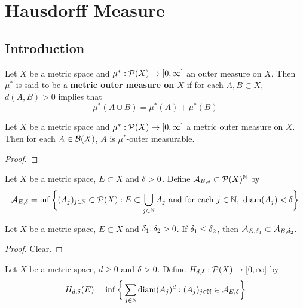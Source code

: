 \documentclass{book}
\begin{document}
	
	
	
	
	
	\newpage
	\chapter{Hausdorff Measure}
	
	\section{Introduction}
	
	\begin{defn}
	Let $X$ be a metric space and $\mu^*: \mathcal{P}(X) \rightarrow [0, \infty]$ an outer measure on $X$. Then $\mu^*$ is said to be a \textbf{metric outer measure on $X$} if for each $A, B \subset X$, $d(A,B) > 0$ implies that 
	\begin{equation*}
	\mu^*(A \cup B) = \mu^*(A) + \mu^*(B)
	\end{equation*}
	\end{defn}	
	
	\begin{ex}
	Let $X$ be a metric space and $\mu^*: \mathcal{P}(X) \rightarrow [0, \infty]$ a metric outer measure on $X$.
	Then for each $A \in \mathcal{B}(X)$, $A$ is $\mu^*$-outer measurable. 
	\end{ex}
	
	\begin{proof}
	
	\end{proof}
	
	
	\begin{defn}
	Let $X$ be a metric space, $E \subset X$ and $\delta >0$. Define $\mathcal{A}_{E, \delta} \subset \mathcal{P}(X)^{\mathbb{N}}$ by 
	\begin{equation*}
	 \mathcal{A}_{E, \delta} = \inf \bigg \{(A_j)_{j \in \mathbb{N}} \subset \mathcal{P}(X): E \subset \bigcup\limits_{j \in \mathbb{N}}A_j \text{ and for each $j \in \mathbb{N}$, } \operatorname{\text{diam}}(A_j) < \delta \bigg \}
	\end{equation*}
	\end{defn}
	
	\begin{ex}
	Let $X$ be a metric space, $E \subset X$ and $\delta_1, \delta_2 >0$. If $\delta_1 \leq \delta_2$, then $\mathcal{A}_{E, \delta_1} \subset \mathcal{A}_{E, \delta_2}$.
	\end{ex}
	
	\begin{proof}
	Clear.
	\end{proof}
	
	\begin{defn}
	Let $X$ be a metric space, $d \geq 0$ and $\delta >0$. Define $H_{d, \delta}: \mathcal{P}(X) \rightarrow [0, \infty]$ by 
	\begin{equation*}
	H_{d, \delta}(E) = \inf \bigg \{\sum_{j \in \mathbb{N}} \operatorname{\text{diam}}(A_j)^d: (A_j)_{j \in \mathbb{N}} \in \mathcal{A}_{E, \delta} \bigg \}
	\end{equation*}
	\end{defn}
	
\end{document}
